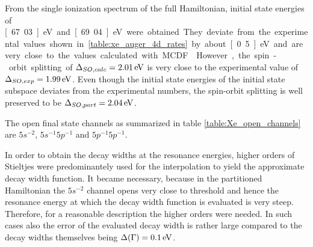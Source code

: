 From the single ionization spectrum of the full Hamiltonian, initial state
energies of \unit[67.03]{eV} and \unit[69.04]{eV} were obtained. They deviate
from the experimental values shown in \ref{table:xe_auger_4d_rates}
by about \unit[0.5]{eV} and are very close to the values calculated with
\ac{MCDF} \cite{Fritzsche11}. However, the spin-orbit splitting of
$\Delta_{SO,calc}=\unit[2.01]{eV}$ is very close to the experimental value
of $\Delta_{SO,exp}=\unit[1.99]{eV}$. Even though the initial state energies of the
initial state subspace deviates from the experimental numbers, the spin-orbit
splitting is well preserved to be $\Delta_{SO,part}=\unit[2.04]{eV}$.

The open final state channels as summarized in table
\ref{table:Xe_open_channels} are $5s^{-2}$, $5s^{-1}5p^{-1}$ and $5p^{-1}5p^{-1}$.


In order to obtain the decay widths at the resonance energies,
higher orders of Stieltjes were predominantely
used for the interpolation to yield the approximate decay width function.
It became necessary, because in the partitioned Hamiltonian the $5s^{-2}$ channel
opens very close to threshold and hence the resonance energy at which the decay width
function is evaluated is very steep. Therefore, for a reasonable description
the higher orders were needed. In such cases also the error of the evaluated decay width 
is rather
large compared to the decay widths themselves being $\Delta(\Gamma)=\unit[0.1]{eV}$.

